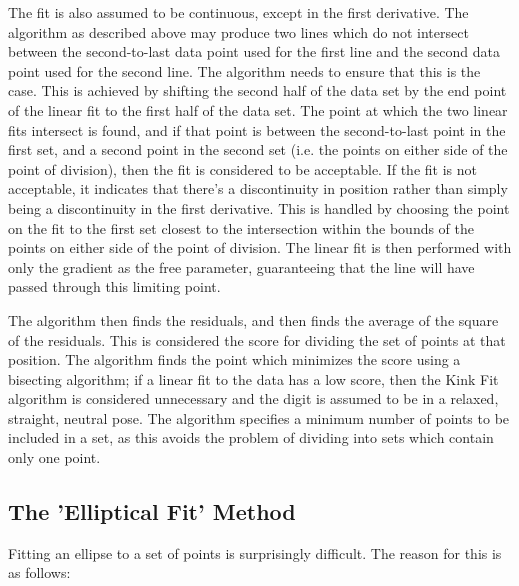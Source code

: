 The fit is also assumed to be continuous, except in the first derivative. The algorithm as described above may produce two lines which do not intersect between the second-to-last data point used for the first line and the second data point used for the second line. The algorithm needs to ensure that this is the case. This is achieved by shifting the second half of the data set by the end point of the linear fit to the first half of the data set. The point at which the two linear fits intersect is found, and if that point is between the second-to-last point in the first set, and a second point in the second set (i.e. the points on either side of the point of division), then the fit is considered to be acceptable. If the fit is not acceptable, it indicates that there's a discontinuity in position rather than simply being a discontinuity in the first derivative. This is handled by choosing the point on the fit to the first set closest to the intersection within the bounds of the points on either side of the point of division. The linear fit is then performed with only the gradient as the free parameter, guaranteeing that the line will have passed through this limiting point.

The algorithm then finds the residuals, and then finds the average of the square of the residuals. This is considered the score for dividing the set of points at that position. The algorithm finds the point which minimizes the score using a bisecting algorithm; if a linear fit to the data has a low score, then the Kink Fit algorithm is considered unnecessary and the digit is assumed to be in a relaxed, straight, neutral pose. The algorithm specifies a minimum number of points to be included in a set, as this avoids the problem of dividing into sets which contain only one point.

\subsection{The 'Elliptical Fit' Method}\label{sec:EllipticalFitMethod}
Fitting an ellipse to a set of points is surprisingly difficult. The reason for this is as follows:

